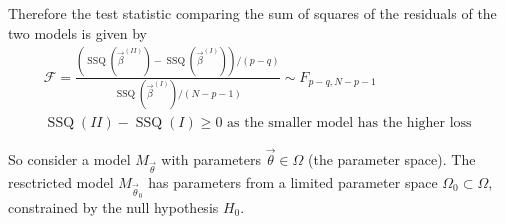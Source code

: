 
Therefore the test statistic comparing the sum of squares of the residuals of the two models is given by
\begin{equation}
    \begin{gathered}
        \mathcal{F} = \frac{\left(\operatorname{SSQ}(\vec{\beta}^{(I I)}) - \operatorname{SSQ}(\vec{\beta}^{(I)}) \right)\slash (p-q)}{\operatorname{SSQ}(\vec{\beta}^{(I)}) \slash (N-p-1)} \sim F_{p-q,N-p-1} \\
        \operatorname{SSQ}(I I) - \operatorname{SSQ}(I) \geq 0 \text { as the smaller model has the higher loss }
    \end{gathered}
\end{equation}


So consider a model $M_\vec{\theta}$ with parameters $\vec{\theta} \in \Omega$ (the parameter space).
The resctricted model $M_{\vec{\theta}_0}$ has parameters from a limited parameter space $\Omega_0 \subset \Omega$,
constrained by the null hypothesis $H_0$.

